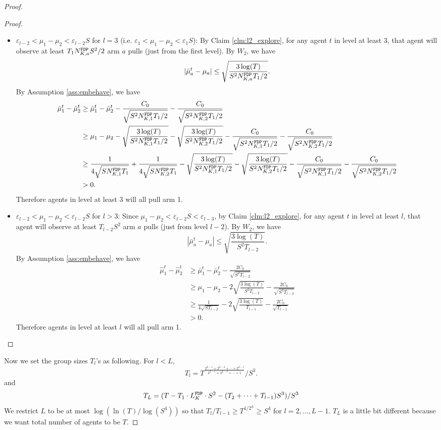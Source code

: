\begin{proof}
\begin{proof}
\begin{itemize}
\item $\varepsilon_{l-2} < \mu_1 - \mu_2 < \varepsilon_{l-2}S$ for $l =3$ (i.e. $\varepsilon_1 < \mu_1 - \mu_2 < \varepsilon_1S$): By Claim \ref{clm:l2_explore}, for any agent $t$ in level at least $3$, that agent will observe at least $T_1\fdpN S^2/2$ arm $a$ pulls (just from the first level). By $W_2$, we have
\[
|\bar{\mu}_a^t - \mu_a| \leq \sqrt{\frac{3\log(T)}{S^2\fdpN T_1/2}}.
\]
By Assumption \ref{ass:embehave}, we have
\begin{align*}
\hat{\mu}_1^t - \hat{\mu}_2^t &\geq \bar{\mu}_1^t - \bar{\mu}_2^t - \frac{C_0}{\sqrt{S^2\fdpN[1]T_1/2}}-\frac{C_0}{\sqrt{S^2\fdpN[2]T_1/2}}  \\
&\geq \mu_1 -\mu_2 -  \sqrt{\frac{3\log(T)}{S^2\fdpN[1]T_1/2}}- \sqrt{\frac{3\log(T)}{S^2\fdpN[2]T_1/2}}- \frac{C_0}{\sqrt{S^2\fdpN[1]T_1/2}}-\frac{C_0}{\sqrt{S^2\fdpN[2]T_1/2}}  \\
&\geq\frac{1}{4\sqrt{S\fdpN[1]T_1}} + \frac{1}{4\sqrt{S\fdpN[2]T_1}}  -  \sqrt{\frac{3\log(T)}{S^2\fdpN[1]T_1/2}}- \sqrt{\frac{3\log(T)}{S^2\fdpN[2]T_1/2}}- \frac{C_0}{\sqrt{S^2\fdpN[1]T_1/2}}-\frac{C_0}{\sqrt{S^2\fdpN[2]T_1/2}}  \\
&>0.
\end{align*}
Therefore agents in level at least 3 will all pull arm 1. 

\item $\varepsilon_{l-2} < \mu_1 - \mu_2 < \varepsilon_{l-2}S$ for $l >3$: Since $\mu_1-\mu_2 < \varepsilon_{l-2}S < \varepsilon_{l-3}$, by Claim \ref{clm:l2_explore}, for any agent $t$ in level at least $l$, that agent will observe at least $T_{l-2}S^2$ arm $a$ pulls (just from level $l-2$). By $W_2$, we have
\[
|\bar{\mu}_a^t - \mu_a| \leq \sqrt{\frac{3\log(T)}{S^2T_{l-2}}}.
\]
By Assumption \ref{ass:embehave}, we have
\begin{align*}
\hat{\mu}_1^t - \hat{\mu}_2^t &\geq \bar{\mu}_1^t - \bar{\mu}_2^t - \frac{2C_0}{\sqrt{S^2T_{l-2}}} \\
&\geq \mu_1 -\mu_2 - 2 \sqrt{\frac{3\log(T)}{S^2T_{l-2}}}- \frac{2C_0}{\sqrt{S^2T_{l-2}}} \\
&\geq\frac{1}{4\sqrt{ST_{l-2}}} -  2 \sqrt{\frac{3\log(T)}{T_{l-1}}}- \frac{2C_0}{\sqrt{T_{l-1}}} \\
&>0.
\end{align*}
Therefore agents in level at least $l$ will all pull arm 1. 
\end{itemize}
\end{proof}

Now we set the group sizes $T_l$'s as following. For $l < L$,
\[
T_l = T^{\frac{2^{L-1} + 2^{L-2} + \cdots + 2^{L-l}}{2^{L-1}+ 2^{L-2} + \cdots + 1}}/S^3.
\]
and 
\[
T_L = (T - T_1 \cdot \GdT\cdot S^2 - (T_2 + \cdots + T_{l-1}) S^3) /S^3
\]
We restrict $L$ to be at most $\log(\ln(T)/\log(S^4))$ so that $T_l / T_{l-1} \geq T^{1/2^L} \geq S^4$ for $l = 2,...,L-1$. $T_L$ is a little bit different because we want total number of agents to be $T$. 


\end{proof}

